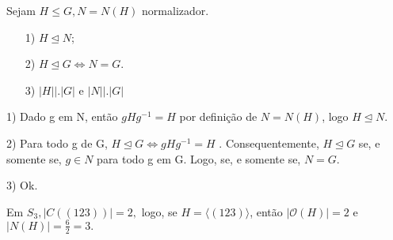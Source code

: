 \documentclass[Algebra/algebra_notes.tex]{subfiles}
\begin{document}
\begin{prop*}
	Sejam \(H\leq G, N = N(H)\) normalizador.
	\begin{itemize}
		\item[1)] \(H \trianglelefteq N\);
		\item[2)] \(H \trianglelefteq{G} \Longleftrightarrow N = G.\)
		\item[3)] \(|H|\bigl|\bigr.|G|\) e \(|N|\bigl|\bigr.|G|\)
	\end{itemize}
\end{prop*}
\begin{proof*}
	1) Dado g em N, então \(gHg^{-1}=H\) por definição de \(N = N(H)\), logo
	\(H \trianglelefteq{N}.\)

	2) Para todo g de G, \(H \trianglelefteq{G} \Longleftrightarrow gHg^{-1} = H\) .
	Consequentemente, \(H \trianglelefteq{G}\) se, e somente se, \(g\in N\) para todo g em G.
	Logo, se, e somente se, \(N = G.\)

	3) Ok. \qedsymbol
\end{proof*}
\begin{example*}
	Em \(S_{3}, |C((123))| = 2,\) logo, se \(H = \langle(123)\rangle\), então \(|\mathcal{O}(H)| = 2\) e
	\(|N(H)| = \frac{6}{2} = 3.\)
\end{example*}
\end{document}
